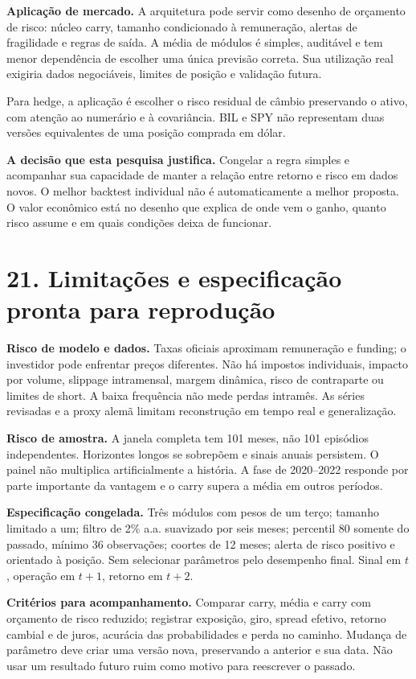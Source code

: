 \documentclass[11pt,a4paper]{article}
\begin{document}
\textbf{Aplicação de mercado.} A arquitetura pode servir como desenho de orçamento de risco: núcleo carry, tamanho condicionado à remuneração, alertas de fragilidade e regras de saída. A média de módulos é simples, auditável e tem menor dependência de escolher uma única previsão correta. Sua utilização real exigiria dados negociáveis, limites de posição e validação futura.

Para hedge, a aplicação é escolher o risco residual de câmbio preservando o ativo, com atenção ao numerário e à covariância. BIL e SPY não representam duas versões equivalentes de uma posição comprada em dólar.

\textbf{A decisão que esta pesquisa justifica.} Congelar a regra simples e acompanhar sua capacidade de manter a relação entre retorno e risco em dados novos. O melhor backtest individual não é automaticamente a melhor proposta. O valor econômico está no desenho que explica de onde vem o ganho, quanto risco assume e em quais condições deixa de funcionar.

\clearpage
\section*{21. Limitações e especificação pronta para reprodução}

\textbf{Risco de modelo e dados.} Taxas oficiais aproximam remuneração e funding; o investidor pode enfrentar preços diferentes. Não há impostos individuais, impacto por volume, slippage intramensal, margem dinâmica, risco de contraparte ou limites de short. A baixa frequência não mede perdas intramês. As séries revisadas e a proxy alemã limitam reconstrução em tempo real e generalização.

\textbf{Risco de amostra.} A janela completa tem 101 meses, não 101 episódios independentes. Horizontes longos se sobrepõem e sinais anuais persistem. O painel não multiplica artificialmente a história. A fase de 2020--2022 responde por parte importante da vantagem e o carry supera a média em outros períodos.

\textbf{Especificação congelada.} Três módulos com pesos de um terço; tamanho limitado a um; filtro de 2\% a.a. suavizado por seis meses; percentil 80 somente do passado, mínimo 36 observações; coortes de 12 meses; alerta de risco positivo e orientado à posição. Sem selecionar parâmetros pelo desempenho final. Sinal em $t$, operação em $t+1$, retorno em $t+2$.

\textbf{Critérios para acompanhamento.} Comparar carry, média e carry com orçamento de risco reduzido; registrar exposição, giro, spread efetivo, retorno cambial e de juros, acurácia das probabilidades e perda no caminho. Mudança de parâmetro deve criar uma versão nova, preservando a anterior e sua data. Não usar um resultado futuro ruim como motivo para reescrever o passado.
\end{document}

